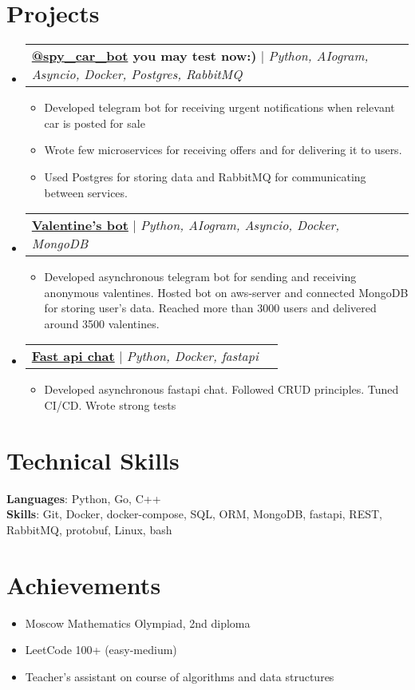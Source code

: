 \documentclass[letterpaper,11pt]{article}
\makeatletter
\newcommand{\resumeItem}[1]{
  \item\small{
    {#1 \vspace{-2pt}}
  }
}
\newcommand{\resumeProjectHeading}[2]{
    \item
    \begin{tabular*}{0.97\textwidth}{l@{\extracolsep{\fill}}r}
      \small#1 & #2 \\
    \end{tabular*}\vspace{-7pt}
}
\newcommand{\resumeSubHeadingListStart}{\begin{itemize}[leftmargin=0.15in, label={}]}
\newcommand{\resumeSubHeadingListEnd}{\end{itemize}}
\newcommand{\resumeItemListStart}{\begin{itemize}}
\newcommand{\resumeItemListEnd}{\end{itemize}\vspace{-5pt}}
\makeatother
\begin{document}
\section{Projects}
    \resumeSubHeadingListStart
     \resumeProjectHeading
    {\textbf{\href{https://t.me/spy_car_bot}{\color{blue}@spy\_car\_bot} you may test now:) } $|$ \emph{Python, AIogram, Asyncio, Docker, Postgres, RabbitMQ}}{}
    \resumeItemListStart
    \resumeItem{\normalsize{Developed telegram bot for receiving urgent notifications when relevant car is posted for sale}}
    \resumeItem{\normalsize{Wrote few microservices for receiving offers and for delivering it to users.}}
    \resumeItem{\normalsize{Used Postgres for storing data and RabbitMQ for communicating between services.}}
    \resumeItemListEnd
        \resumeProjectHeading
    {\textbf{\href{https://github.com/yasamprom/valentine}{\color{blue}Valentine's bot}} $|$ \emph{Python, AIogram, Asyncio, Docker, MongoDB}}{}
          \resumeItemListStart
            \resumeItem{\normalsize{Developed asynchronous telegram bot for sending and receiving anonymous valentines. Hosted bot on aws-server and connected MongoDB for storing user's data. Reached more than 3000 users and delivered around 3500 valentines.}}
        \resumeItemListEnd

    \resumeProjectHeading
{\textbf{\href{https://github.com/yasamprom/fastapichat}{\color{blue}Fast api chat}} $|$ \emph{Python, Docker, fastapi}}{}
        \resumeItemListStart
          \resumeItem{\normalsize{Developed asynchronous fastapi chat. Followed CRUD principles. Tuned CI/CD. Wrote strong tests}}
        \resumeItemListEnd


    \resumeSubHeadingListEnd


\section{Technical Skills}
 \begin{itemize}[leftmargin=0.15in, label={}]
    \small{\item{
     \textbf{Languages}{: Python, Go, C++} \\
     \textbf{Skills}{: Git, Docker, docker-compose, SQL, ORM, MongoDB, fastapi, REST, RabbitMQ, protobuf, Linux, bash} \\
    }}
 \end{itemize}

\section{Achievements}
\resumeItemListStart
\resumeItem{\normalsize{Moscow Mathematics
		Olympiad, 2nd diploma}}
\resumeItem{\normalsize{LeetCode 100+ (easy-medium)}}
\resumeItem{\normalsize{Teacher's assistant on course of algorithms and data structures}}
\resumeItemListEnd





\end{document}

